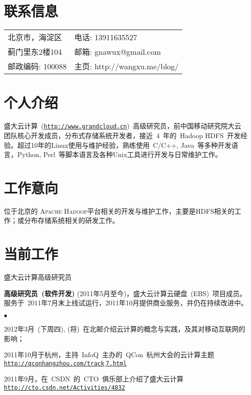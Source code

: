 \documentclass[margin,line]{res}
\newenvironment{list1}{
  \begin{list}{\ding{113}}{%
      \setlength{\itemsep}{0in}
      \setlength{\parsep}{0in} \setlength{\parskip}{0in}
      \setlength{\topsep}{0in} \setlength{\partopsep}{0in} 
      \setlength{\leftmargin}{0.17in}}}{\end{list}}
\newenvironment{list2}{
  \begin{list}{$\bullet$}{%
      \setlength{\itemsep}{0in}
      \setlength{\parsep}{0in} \setlength{\parskip}{0in}
      \setlength{\topsep}{0in} \setlength{\partopsep}{0in} 
      \setlength{\leftmargin}{0.2in}}}{\end{list}}
\newcommand{\http}{http:/\hspace{-0.3ex}/}
\newcommand{\hindent}{\mbox{\hspace{8ex}}}
\begin{document}

\begin{resume}
\section{联系信息}
\vspace{.05in}
\begin{tabular}{@{}p{2in}|p{3in}}
北京市，海淀区 	   & \textsf{电话:} {13911635527}\\         
蓟门里东2楼104     & \textsf{邮箱:} {gnawux@gmail.com}\\       
邮政编码: 100088   & \textsf{主页:} {\http{}wangxu.me/blog/}\\
\end{tabular}

\section{个人介绍}

盛大云计算~(\href{http://www.grandcloud.cn}{\tt \http{}www.grandcloud.cn})~高级研究员，前中国移动研究院大云团队核心开发成员，分布式存储系统开发者，接近~4~年的~Hadoop HDFS~开发经验。超过10年的Linux使用与维护经验，熟练使用~C/C++, Java~等多种开发语言，Python, Perl~等脚本语言及各种Unix工具进行开发与日常维护工作。 

\section{工作意向}

位于北京的\textsc{ Apache Hadoop}平台相关的开发与维护工作，主要是HDFS相关的工作；或分布存储系统相关的研发工作。

\section{当前工作}
\textsf{盛大云计算高级研究员}\\
\vspace*{-.1in}
\begin{list1}
\item[] \textbf{高级研究员~(软件开发)}\/ (2011年5月至今)，盛大云计算云硬盘~(EBS)~项目成员。服务于~2011年7月末上线试运行，2011年10月提供商业服务，并仍在持续改进中。
\begin{list2}
\vspace*{.05in}
\item 2012年3月~(下周四), (将)~在北邮介绍云计算的概念与实践，及其对移动互联网的影响；
\item 2011年10月于杭州，主持~InfoQ~主办的~QCon~杭州大会的云计算主题~\\ \hindent\href{http://qconhangzhou.com/track_7.html}{\tt\http{}qconhangzhou.com/track$\underline{}$7.html}
\item 2011年9月，在~CSDN~的~CTO~俱乐部上介绍了盛大云计算~\\ \hindent\href{http://cto.csdn.net/Activities/4832}{\tt\http{}cto.csdn.net/Activities/4832}
\end{list2}
\end{list1}



\end{resume}
\end{document}

